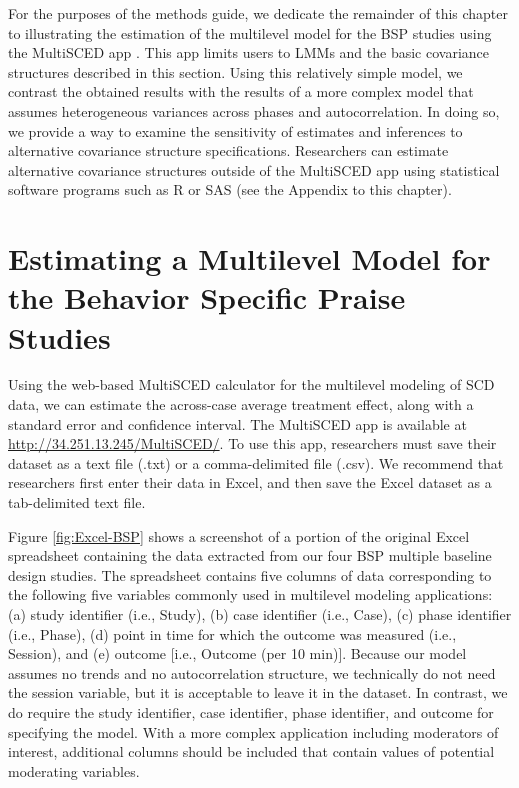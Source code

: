 \documentclass[
]{book}
\begin{document}
For the purposes of the methods guide, we dedicate the remainder of this chapter to illustrating the estimation of the multilevel model for the BSP studies using the MultiSCED app \citep{Declercq2019}. This app limits users to LMMs and the basic covariance structures described in this section. Using this relatively simple model, we contrast the obtained results with the results of a more complex model that assumes heterogeneous variances across phases and autocorrelation. In doing so, we provide a way to examine the sensitivity of estimates and inferences to alternative covariance structure specifications. Researchers can estimate alternative covariance structures outside of the MultiSCED app using statistical software programs such as R or SAS (see the Appendix to this chapter).

\hypertarget{estimating-a-multilevel-model-for-the-behavior-specific-praise-studies}{%
\section{Estimating a Multilevel Model for the Behavior Specific Praise Studies}\label{estimating-a-multilevel-model-for-the-behavior-specific-praise-studies}}

Using the web-based MultiSCED calculator \citep{Declercq2019} for the multilevel modeling of SCD data, we can estimate the across-case average treatment effect, along with a standard error and confidence interval. The MultiSCED app is available at \url{http://34.251.13.245/MultiSCED/}. To use this app, researchers must save their dataset as a text file (.txt) or a comma-delimited file (.csv). We recommend that researchers first enter their data in Excel, and then save the Excel dataset as a tab-delimited text file.

Figure \ref{fig:Excel-BSP} shows a screenshot of a portion of the original Excel spreadsheet containing the data extracted from our four BSP multiple baseline design studies. The spreadsheet contains five columns of data corresponding to the following five variables commonly used in multilevel modeling applications: (a) study identifier (i.e., Study), (b) case identifier (i.e., Case), (c) phase identifier (i.e., Phase), (d) point in time for which the outcome was measured (i.e., Session), and (e) outcome {[}i.e., Outcome (per 10 min){]}. Because our model assumes no trends and no autocorrelation structure, we technically do not need the session variable, but it is acceptable to leave it in the dataset. In contrast, we do require the study identifier, case identifier, phase identifier, and outcome for specifying the model. With a more complex application including moderators of interest, additional columns should be included that contain values of potential moderating variables.
\end{document}
